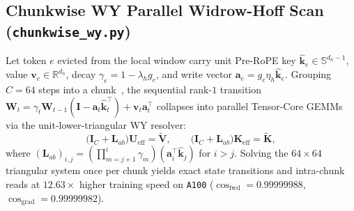 \documentclass[10pt,twocolumn]{article}
\begin{document}
\subsection{Chunkwise WY Parallel Widrow-Hoff Scan (\texttt{chunkwise\_wy.py})}
Let token $e$ evicted from the local window carry unit Pre-RoPE key $\hat{\mathbf{k}}_e \in \mathbb{S}^{d_h - 1}$, value $\mathbf{v}_e \in \mathbb{R}^{d_h}$, decay $\gamma_e = 1 - \lambda_h g_e$, and write vector $\mathbf{a}_e = g_e \eta_h \hat{\mathbf{k}}_e$. Grouping $C=64$ steps into a chunk~\citep{bischof1987wy,yang2024parallelizing}, the sequential rank-$1$ transition $\mathbf{W}_{t} = \gamma_t \mathbf{W}_{t-1}(\mathbf{I} - \mathbf{a}_t \hat{\mathbf{k}}_t^\top) + \mathbf{v}_t \mathbf{a}_t^\top$ collapses into parallel Tensor-Core GEMMs via the unit-lower-triangular WY resolver:
\begin{equation}
    \big(\mathbf{I}_C + \mathbf{L}_{ab}\big)\mathbf{U}_{\text{eff}} = \widetilde{\mathbf{V}}, \qquad \big(\mathbf{I}_C + \mathbf{L}_{ab}\big)\mathbf{K}_{\text{eff}} = \widetilde{\mathbf{K}},
    \label{eq:chunkwise_wy}
\end{equation}
where $(\mathbf{L}_{ab})_{i,j} = (\prod_{m=j+1}^{i}\gamma_m)(\mathbf{a}_i^\top \hat{\mathbf{k}}_j)$ for $i > j$. Solving the $64\times 64$ triangular system once per chunk yields exact state transitions and intra-chunk reads at $\mathbf{12.63\times}$ higher training speed on \texttt{A100} ($\cos_{\text{fwd}}=0.99999988$, $\cos_{\text{grad}}=0.99999982$).
\end{document}
